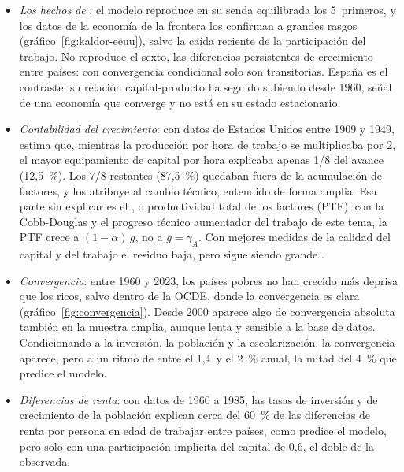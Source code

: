 \documentclass[11pt]{article}
\begin{document}
\begin{itemize}
\item \emph{Los hechos de }: el modelo reproduce en su senda equilibrada los 5~primeros, y los datos de la economía de la frontera los confirman a grandes rasgos (gráfico~\ref{fig:kaldor-eeuu}), salvo la caída reciente de la participación del trabajo. No reproduce el sexto, las diferencias persistentes de crecimiento entre países: con convergencia condicional solo son transitorias. España es el contraste: su relación capital-producto ha seguido subiendo desde 1960, señal de una economía que converge y no está en su estado estacionario\nocite{GGDC2025PWT,CE2026AMECO}.
\item \emph{Contabilidad del crecimiento}: con datos de Estados Unidos entre 1909 y 1949, \textcite[pp.~316 y 320]{Solow1957} estima que, mientras la producción por hora de trabajo se multiplicaba por 2, el mayor equipamiento de capital por hora explicaba apenas 1/8 del avance (12,5~\%). Los 7/8 restantes (87,5~\%) quedaban fuera de la acumulación de factores, y  los atribuye al cambio técnico, entendido de forma amplia. Esa parte sin explicar es el , o productividad total de los factores (PTF); con la Cobb-Douglas y el progreso técnico aumentador del trabajo de este tema, la PTF crece a $(1-\alpha)\,g$, no a $g=\gamma_A$. Con mejores medidas de la calidad del capital y del trabajo el residuo baja, pero sigue siendo grande .
\item \emph{Convergencia}: entre 1960 y 2023, los países pobres no han crecido más deprisa que los ricos, salvo dentro de la OCDE, donde la convergencia es clara (gráfico~\ref{fig:convergencia}). Desde 2000 aparece algo de convergencia absoluta también en la muestra amplia\nocite{KremerWillisYou2022}, aunque lenta y sensible a la base de datos\nocite{GGDC2025PWT,BoltvanZanden2025}. Condicionando a la inversión, la población y la escolarización, la convergencia aparece, pero a un ritmo de entre el 1,4~y el 2~\% anual\nocite{MankiwRomerWeil1992}, la mitad del 4~\% que predice el modelo.
\item \emph{Diferencias de renta}: con datos de 1960 a 1985, las tasas de inversión y de crecimiento de la población explican cerca del 60~\% de las diferencias de renta por persona en edad de trabajar entre países, como predice el modelo, pero solo con una participación implícita del capital de 0,6, el doble de la observada\nocite{MankiwRomerWeil1992}.
\end{itemize}
\end{document}
